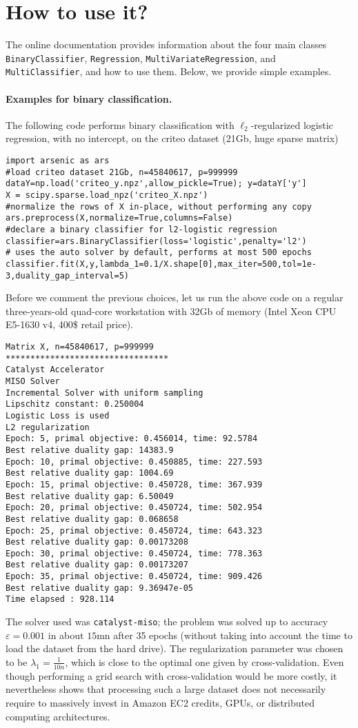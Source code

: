 \documentclass{article}
\begin{document}
\section{How to use it?}
The online documentation provides information about the four main classes
\texttt{BinaryClassifier}, \texttt{Regression},
\texttt{MultiVariateRegression}, and \texttt{MultiClassifier}, and how to use
them. Below, we provide simple examples.
\paragraph{Examples for binary classification.}
The following code performs binary classification with $\ell_2$-regularized logistic regression, with no intercept, on the criteo dataset (21Gb, huge sparse matrix)
\begin{verbatim}
import arsenic as ars
#load criteo dataset 21Gb, n=45840617, p=999999
dataY=np.load('criteo_y.npz',allow_pickle=True); y=dataY['y']
X = scipy.sparse.load_npz('criteo_X.npz')
#normalize the rows of X in-place, without performing any copy
ars.preprocess(X,normalize=True,columns=False) 
#declare a binary classifier for l2-logistic regression
classifier=ars.BinaryClassifier(loss='logistic',penalty='l2')
# uses the auto solver by default, performs at most 500 epochs
classifier.fit(X,y,lambda_1=0.1/X.shape[0],max_iter=500,tol=1e-3,duality_gap_interval=5) 
\end{verbatim}

Before we comment the previous choices, let us 
run the above code on a regular three-years-old quad-core workstation with 32Gb of memory
(Intel Xeon CPU E5-1630 v4, 400\$ retail price). 
\begin{verbatim}
Matrix X, n=45840617, p=999999
*********************************
Catalyst Accelerator
MISO Solver
Incremental Solver with uniform sampling
Lipschitz constant: 0.250004
Logistic Loss is used
L2 regularization
Epoch: 5, primal objective: 0.456014, time: 92.5784
Best relative duality gap: 14383.9
Epoch: 10, primal objective: 0.450885, time: 227.593
Best relative duality gap: 1004.69
Epoch: 15, primal objective: 0.450728, time: 367.939
Best relative duality gap: 6.50049
Epoch: 20, primal objective: 0.450724, time: 502.954
Best relative duality gap: 0.068658
Epoch: 25, primal objective: 0.450724, time: 643.323
Best relative duality gap: 0.00173208
Epoch: 30, primal objective: 0.450724, time: 778.363
Best relative duality gap: 0.00173207
Epoch: 35, primal objective: 0.450724, time: 909.426
Best relative duality gap: 9.36947e-05
Time elapsed : 928.114
\end{verbatim}
The solver used was \texttt{catalyst-miso}; the problem was solved up to
accuracy $\varepsilon=0.001$ in about $15$mn after 35 epochs (without taking into account
the time to load the dataset from the hard drive). The regularization
parameter was chosen to be $\lambda_1=\frac{1}{10n}$, which is close to the
optimal one given by cross-validation.  Even though performing a grid search with
cross-validation would be more costly, it nevertheless shows that processing such 
a large dataset does not necessarily require to massively invest in Amazon EC2 credits,
GPUs, or distributed computing architectures.
\end{document}
